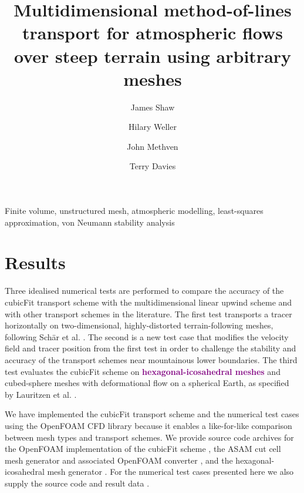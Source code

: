 \documentclass[times]{elsarticle}
\newcommand{\revone}[1]{\textcolor{purple}{\textbf{#1}}}
\begin{document}
\begin{frontmatter}
\title{Multidimensional method-of-lines transport for atmospheric flows over steep terrain using arbitrary meshes}
\author[uor]{James Shaw}
\author[uor]{Hilary Weller}
\author[uor]{John Methven}
\author[mo]{Terry Davies}

\address[uor]{Department of Meteorology, University of Reading, Reading, United Kingdom}
\address[mo]{Met Office, Exeter, United Kingdom}



\begin{keyword}
	Finite volume, unstructured mesh, atmospheric modelling, least-squares approximation, von Neumann stability analysis
\end{keyword}
\end{frontmatter}





\section{Results}
\label{sec:results}

Three idealised numerical tests are performed to compare the accuracy of the cubicFit transport scheme with the multidimensional linear upwind scheme and with other transport schemes in the literature.  The first test transports a tracer horizontally on two-dimensional, highly-distorted terrain-following meshes, following Sch\"{a}r et al. \citep{schaer2002}.
The second is a new test case that modifies the velocity field and tracer position from the first test in order to challenge the stability and accuracy of the transport schemes near mountainous lower boundaries.
The third test evaluates the cubicFit scheme on \revone{hexagonal-icosahedral meshes} and cubed-sphere meshes with deformational flow on a spherical Earth, as specified by Lauritzen et al. \citep{lauritzen2012}.

We have implemented the cubicFit transport scheme and the numerical test cases using the OpenFOAM CFD library because it enables a like-for-like comparison between mesh types and transport schemes.  We provide source code archives for the OpenFOAM implementation of the cubicFit scheme \citep{atmosfoam}, the ASAM cut cell mesh generator \citep{asam_grid} and associated OpenFOAM converter \citep{gmv2openfoam}, and the hexagonal-icosahedral mesh generator \citep{geodesic-mesh}.  For the numerical test cases presented here we also supply the source code \citep{atmostests} and result data \citep{atmostests-data}.
\end{document}
